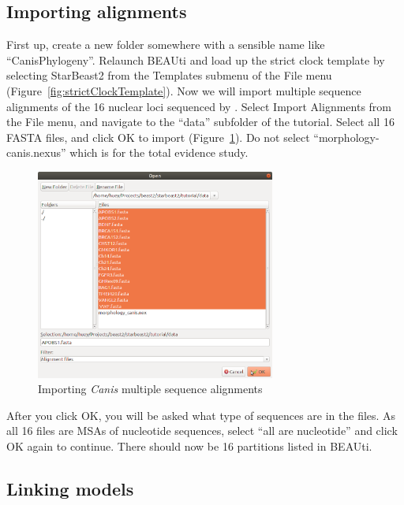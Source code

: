 \documentclass[12pt]{article}
\begin{document}
\subsection{Importing alignments}
\label{subsec:importingAlignments}

First up, create a new folder somewhere with a sensible name like
``CanisPhylogeny''. Relaunch BEAUti and load up the strict clock
template by selecting StarBeast2 from the Templates submenu of the File menu
(Figure~\ref{fig:strictClockTemplate}). Now we will import multiple sequence
alignments of the 16 nuclear loci sequenced by \cite{LindbladToh2005}. Select
Import Alignments from the File menu, and navigate to the ``data'' subfolder
of the tutorial. Select all 16 FASTA files, and click OK to import
(Figure~\ref{fig:fastaFileImport}). Do not select ``morphology-canis.nexus''
which is for the total evidence study.

\begin{figure}[htb!]
\centering
\includegraphics[width=0.7\textwidth]{figures/fastaFileImport.png}
\caption
{Importing \textit{Canis} multiple sequence alignments}
\label{fig:fastaFileImport}
\end{figure}

After you click OK, you will be asked what type of sequences are in the files.
As all 16 files are MSAs of nucleotide sequences, select ``all are nucleotide''
and click OK again to continue. There should now be 16 partitions listed in
BEAUti.

\clearpage

\subsection{Linking models}
\label{subsec:linkingModels}
\end{document}
